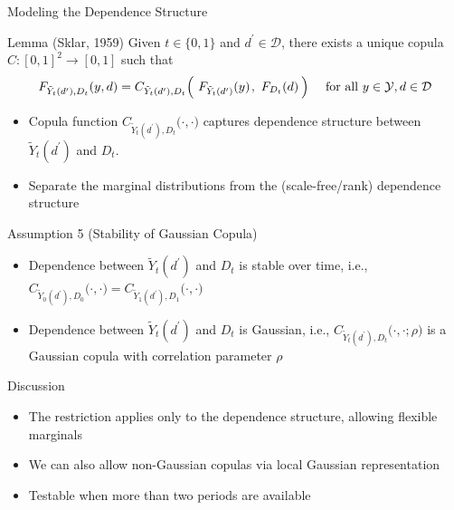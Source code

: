\documentclass[aspectratio=1610, 9pt]{beamer}
\begin{document}
\begin{frame}{Modeling the Dependence Structure} \label{lemma:copula}

\begin{block}{Lemma (Sklar, 1959)}
 Given $t\in\{0,1\}$ and $d^\prime \in\mathcal{D}$, there exists a unique copula $C:[0,1]^2\to [0,1]$ such that
$$F_{\tilde{Y}_t(d^\prime),D_t}(y,d)=C_{\tilde{Y}_t(d^\prime),D_t}\Big(\ F_{\tilde{Y}_t(d^\prime)}(y)\hspace{0.1em},\ F_{D_t}(d) \hspace{0.2em} \Big)\quad \text{ for all }y\in\mathcal{Y},d\in\mathcal{D}$$
    
\end{block}

\begin{itemize}
    \item  Copula function $C_{\tilde{Y}_t(d^\prime),D_t}\big(\cdot,\cdot\big)$ captures dependence structure between $\tilde{Y}_t(d^\prime)$ and $D_t$. \ \ \hyperlink{def:copula}{\beamergotobutton{}} 
    \item Separate the marginal distributions from the (scale-free/\hspace{0.06em}rank) dependence
structure
\end{itemize}
\vspace{0.5cm}
    \begin{block}{Assumption 5 (Stability of Gaussian Copula)} 
    \begin{itemize}
        \item[(i)] Dependence between $\tilde{Y}_t(d^\prime) $ and $D_t$ is stable over time, i.e., $C_{\tilde{Y}_0(d^\prime),D_0}\big(\cdot,\cdot\big)=C_{\tilde{Y}_1(d^\prime),D_1}\big(\cdot,\cdot\big)$
    \item[(ii)] Dependence between $\tilde{Y}_t(d^\prime) $ and $D_t$ is Gaussian,
    i.e., $C_{\tilde{Y}_t(d^\prime),D_t}\big(\cdot,\cdot; \rho \big)$ is a Gaussian copula with correlation parameter $\rho$
    \end{itemize}
    
    \end{block}
\end{frame}


\begin{frame}{Discussion} 
    \begin{itemize}
        \item The restriction applies only to the dependence structure, allowing flexible marginals
        \item We can also allow non-Gaussian copulas via local Gaussian representation \label{slides:LGR} \hyperlink{lemma:LGR}{\beamergotobutton{}}
    \item Testable when more than two periods are available
        
    \end{itemize}
\end{frame}
\end{document}
